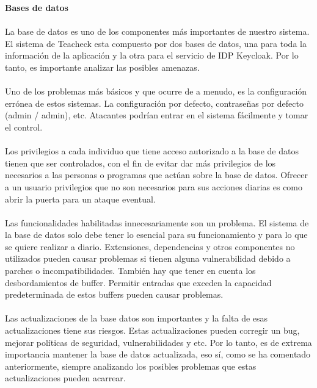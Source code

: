\textbf{Bases de datos}
\paragraph{}
La base de datos es uno de los componentes más importantes de nuestro sistema. El sistema de Teacheck esta compuesto por dos bases de datos, una para toda la información de la aplicación y la otra para el servicio de IDP Keycloak. Por lo tanto, es importante analizar las posibles amenazas.
\paragraph{}
Uno de los problemas más básicos y que ocurre de a menudo, es la configuración errónea de estos sistemas. La configuración por defecto, contraseñas por defecto (admin / admin), etc.  Atacantes podrían entrar en el sistema fácilmente y tomar el control.
\paragraph{}
Los privilegios a cada individuo que tiene acceso autorizado a la base de datos tienen que ser controlados, con el fin de evitar dar más privilegios de los necesarios a las personas o programas que actúan sobre la base de datos. Ofrecer a un usuario privilegios que no son necesarios para sus acciones diarias es como abrir la puerta para un ataque eventual.
\paragraph{}
Las funcionalidades habilitadas innecesariamente son un problema. El sistema de la base de datos solo debe tener lo esencial para su funcionamiento y para lo que se quiere realizar a diario. Extensiones, dependencias y otros componentes no utilizados pueden causar problemas si tienen alguna vulnerabilidad debido a parches o incompatibilidades.
También hay que tener en cuenta los desbordamientos de buffer. Permitir entradas que exceden la capacidad predeterminada de estos buffers pueden causar problemas.
\paragraph{}
Las actualizaciones de la base datos son importantes y la falta de esas actualizaciones tiene sus riesgos. Estas actualizaciones pueden corregir un bug, mejorar políticas de seguridad, vulnerabilidades y etc. Por lo tanto, es de extrema importancia mantener la base de datos actualizada, eso sí, como se ha comentado anteriormente, siempre analizando los posibles problemas que estas actualizaciones pueden acarrear.

